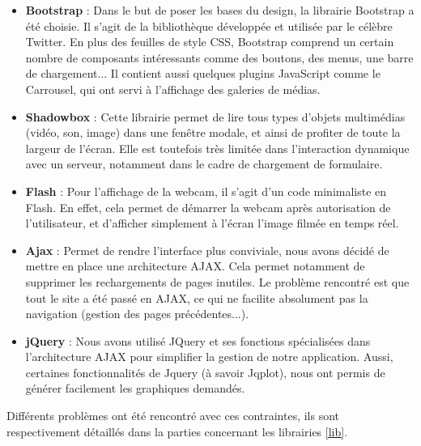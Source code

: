\documentclass[twoside]{EPURapport}
\begin{document}
	\begin{itemize}
		\item \textbf{Bootstrap} : Dans le but de poser les bases du design, la librairie Bootstrap a été choisie. Il s'agit de la bibliothèque développée et utilisée par le célèbre Twitter. En plus des feuilles de style CSS, Bootstrap comprend un certain nombre de composants intéressants comme des boutons, des menus, une barre de chargement... Il contient aussi quelques plugins JavaScript comme le Carrousel, qui ont servi à l'affichage des galeries de médias.\\
		
		\item \textbf{Shadowbox} : Cette librairie permet de lire tous types d'objets multimédias (vidéo, son, image) dans une fenêtre modale, et ainsi de profiter de toute la largeur de l'écran. Elle est toutefois très limitée dans l'interaction dynamique avec un serveur, notamment dans le cadre de chargement de formulaire.\\
		
		\item \textbf{Flash} : Pour l'affichage de la webcam, il s'agit d'un code minimaliste en Flash. En effet, cela permet de démarrer la webcam après autorisation de l'utilisateur, et d'afficher simplement à l'écran l'image filmée en temps réel.\\
		
		\item \textbf{Ajax} : Permet de rendre l'interface plus conviviale, nous avons décidé de mettre en place une architecture AJAX. Cela permet notamment de supprimer les rechargements de pages inutiles. Le problème rencontré est que tout le site a été passé en AJAX, ce qui ne facilite absolument pas la navigation (gestion des pages précédentes...).\\
		
		\item \textbf{jQuery} : Nous avons utilisé JQuery et ses fonctions spécialisées dans l'architecture AJAX pour simplifier la gestion de notre application. Aussi, certaines fonctionnalités de Jquery (à savoir Jqplot), nous ont permis de générer facilement les graphiques demandés.\\
	\end{itemize}
	
	Différents problèmes ont été rencontré avec ces contraintes, ils sont respectivement détaillés dans la parties concernant les librairies \ref{lib}.
\end{document}
